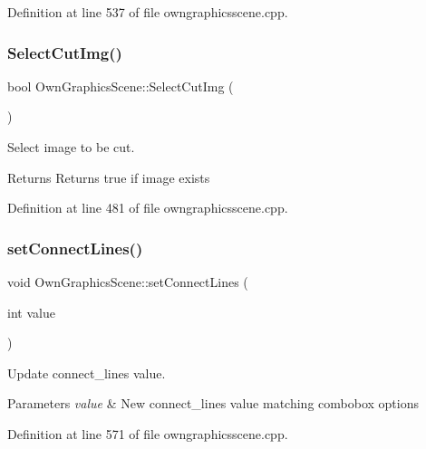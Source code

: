 Definition at line 537 of file owngraphicsscene.\+cpp.

\mbox{\label{classOwnGraphicsScene_ae79aa179ce90ab26f06d7d17eed96b93}} 
\subsubsection{\texorpdfstring{Select\+Cut\+Img()}{SelectCutImg()}}
{\footnotesize\ttfamily bool Own\+Graphics\+Scene\+::\+Select\+Cut\+Img (\begin{DoxyParamCaption}{ }\end{DoxyParamCaption})}



Select image to be cut. 

\begin{DoxyReturn}{Returns}
Returns true if image exists 
\end{DoxyReturn}


Definition at line 481 of file owngraphicsscene.\+cpp.

\mbox{\label{classOwnGraphicsScene_ad62254e1884fa4817ff1beaa3bc6c011}} 
\subsubsection{\texorpdfstring{set\+Connect\+Lines()}{setConnectLines()}}
{\footnotesize\ttfamily void Own\+Graphics\+Scene\+::set\+Connect\+Lines (\begin{DoxyParamCaption}\item[{int}]{value }\end{DoxyParamCaption})}



Update connect\+\_\+lines value. 


\begin{DoxyParams}{Parameters}
{\em value} & New connect\+\_\+lines value matching combobox options \\
\hline
\end{DoxyParams}


Definition at line 571 of file owngraphicsscene.\+cpp.

